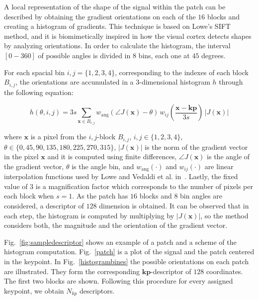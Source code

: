 \documentclass[entropy,article,submit,moreauthors,pdftex,10pt,a4paper]{mdpi}
\begin{document}
A local representation of the shape of the signal within the patch can be described by obtaining the gradient orientations on each of the $16$ blocks and creating a histogram of gradients.  This technique is based on Lowe's SIFT~\citep{Lowe2004} method, and it is biomimetically inspired in how the visual cortex detects shapes by analyzing orientations.   In order to calculate the histogram, the interval $[0-360]$ of possible angles is divided in $8$ bins, each one at $45$ degrees.

 For each spacial bin $ i,j = \{1,2,3,4\} $, corresponding to the indexes of each block $B_{i,j}$,  the orientations are accumulated in a  $3$-dimensional histogram $h$ through the following equation: 
 

\begin{equation}
 h(\theta,i,j) = 3s \sum_{\mathbf{x} \in B_{i,j}} w_\mathrm{ang}(\angle J(\mathbf{x}) - \theta)\, w_{ij}\left(\frac{\mathbf{x} - \mathbf{kp}}{3 s}\right)\, |J(\mathbf{x})|
\label{eq:histogram}
\end{equation}

\noindent  where $\mathbf{x}$ is a pixel from  the $i,j$-block $B_{i,j}$, $ i,j \in \{1,2,3,4\} $, $ \theta \in \{0, 45, 90, 135, 180, 225, 270, 315\} $,  $ |J(\mathbf{x})| $ is the norm of the gradient vector in the pixel $\mathbf{x}$ and it is computed using finite differences, $\angle J(\mathbf{x}) $ is the angle of the gradient vector,  $\theta$ is the angle bin,   and $ w_\mathrm{ang}(\cdot) $  and $ w_{ij}(\cdot) $ are linear interpolation functions used by Lowe and Vedaldi et al. in~\citep{Lowe2004,Vedaldi2010}.  Lastly, the fixed value of $ 3 $ is a magnification factor which corresponds to the number of pixels per each block when $s = 1$.  As the patch has  $16$ blocks and  $8$ bin angles are considered, a descriptor of $128$ dimension is obtained. It can be observed that in each step, the histogram is computed by multiplying by $ |J(\mathbf{x})| $, so the method considers both, the magnitude and the orientation of the gradient vector. 


Fig.~\ref{fig:sampledescriptor} shows an example of a patch and a scheme of the histogram computation. Fig.~\ref{patch} is a plot of the signal and the patch centered in the keypoint. In Fig.~\ref{histogrambines} the possible orientations on each patch are illustrated. They form the corresponding $\mathbf{kp}$-descriptor of $128$ coordinates. The first two blocks are shown.  Following this procedure for every assigned keypoint, we obtain $N_{kp}$ descriptors.
 
\end{document}
